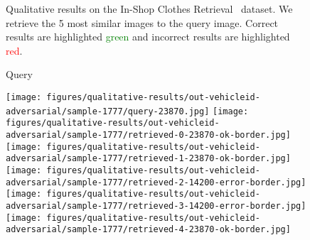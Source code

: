 \documentclass[10pt,journal,compsoc]{IEEEtran}
\begin{document}
\begin{figure*}[htbp]
\begin{center}
    \end{center}
    \caption{Qualitative results on the In-Shop Clothes Retrieval~\cite{liu2016deepfashion} dataset. 
             We retrieve the 5 most similar images to the query image.
             Correct results are highlighted \textcolor{green}{green} and incorrect results are highlighted \textcolor{red}{red}.}
    \label{fig:qualitative-clothes}
\end{figure*}\begin{figure*}[htbp]
    \begin{center}
    \begin{minipage}{0.16\textwidth}
    \centering
    Query
    \end{minipage}
    \begin{minipage}{0.16\textwidth}
    \end{minipage}
    \begin{minipage}{0.16\textwidth}
    \end{minipage}
    \begin{minipage}{0.16\textwidth}
    \end{minipage}
    \begin{minipage}{0.16\textwidth}
    \end{minipage}
    \begin{minipage}{0.16\textwidth}
    \end{minipage}
    \hspace{0.5cm}

    \texttt{[image: figures/qualitative-results/out-vehicleid-adversarial/sample-1777/query-23870.jpg]}
    \texttt{[image: figures/qualitative-results/out-vehicleid-adversarial/sample-1777/retrieved-0-23870-ok-border.jpg]}
    \texttt{[image: figures/qualitative-results/out-vehicleid-adversarial/sample-1777/retrieved-1-23870-ok-border.jpg]}
    \texttt{[image: figures/qualitative-results/out-vehicleid-adversarial/sample-1777/retrieved-2-14200-error-border.jpg]}
    \texttt{[image: figures/qualitative-results/out-vehicleid-adversarial/sample-1777/retrieved-3-14200-error-border.jpg]}
    \texttt{[image: figures/qualitative-results/out-vehicleid-adversarial/sample-1777/retrieved-4-23870-ok-border.jpg]}


\end{center}
\end{figure*}
\end{document}
